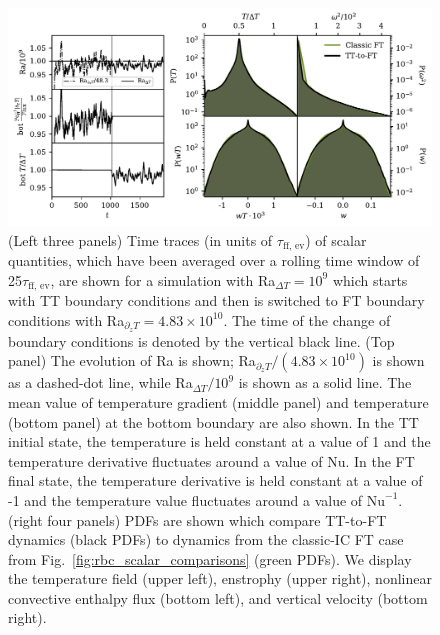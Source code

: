 \documentclass[aps, pre, onecolumn, nofootinbib, notitlepage, groupedaddress, amsfonts, amssymb, amsmath, longbibliography, superscriptaddress]{revtex4-1}
\begin{document}
\begin{figure}
\includegraphics[width=\textwidth]{./figs/rbc_restart_description.pdf}
\caption{ 
	(Left three panels) Time traces (in units of $\tau_{\text{ff, ev}}$) of scalar quantities, which have been averaged over a rolling time window of 25$\tau_{\text{ff, ev}}$, are shown for a simulation with Ra$_{\Delta T} = 10^9$ which starts with TT boundary conditions and then is switched to FT boundary conditions with Ra$_{\partial_z T} = 4.83 \times 10^{10}$.
	The time of the change of boundary conditions is denoted by the vertical black line.
	(Top panel) The evolution of Ra is shown; Ra$_{\partial_z T}/(4.83\times 10^{10})$ is shown as a dashed-dot line, while Ra$_{\Delta T}/10^9$ is shown as a solid line.
	The mean value of temperature gradient (middle panel) and temperature (bottom panel) at the bottom boundary are also shown.
	In the TT initial state, the temperature is held constant at a value of 1 and the temperature derivative fluctuates around a value of $\text{Nu}$.
	In the FT final state, the temperature derivative is held constant at a value of -1 and the temperature value fluctuates around a value of $\text{Nu}^{-1}$.
	(right four panels) PDFs are shown which compare TT-to-FT dynamics (black PDFs) to dynamics from the classic-IC FT case from Fig.~\ref{fig:rbc_scalar_comparisons} (green PDFs).
	We display the temperature field (upper left), enstrophy (upper right), nonlinear convective enthalpy flux (bottom left), and vertical velocity (bottom right).
\label{fig:rbc_restart_description} }
\vspace{-0.25cm}
\end{figure}
\end{document}
